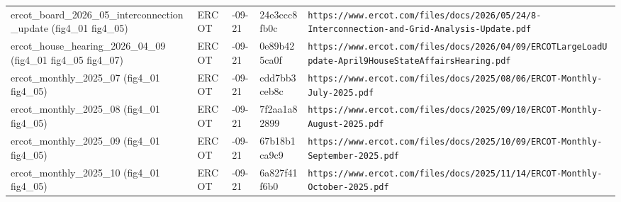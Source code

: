 \begin{longtable}{>{\raggedright\arraybackslash}p{3.0cm}>{\raggedright\arraybackslash}p{1.5cm}>{\raggedright\arraybackslash}p{1.4cm}>{\raggedright\arraybackslash}p{2.0cm}>{\raggedright\arraybackslash}p{6.0cm}}
ercot\_\allowbreak{}board\_\allowbreak{}2026\_\allowbreak{}05\_\allowbreak{}interconnection\_\allowbreak{}update (fig4\_\allowbreak{}01 fig4\_\allowbreak{}05) & ERCOT & 2026-09-21 & 24e3ccc8fb0c & \texttt{https:\allowbreak{}/\allowbreak{}/\allowbreak{}www.\allowbreak{}ercot.\allowbreak{}com/\allowbreak{}files/\allowbreak{}docs/\allowbreak{}2026/\allowbreak{}05/\allowbreak{}24/\allowbreak{}8-\allowbreak{}Interconnection-\allowbreak{}and-\allowbreak{}Grid-\allowbreak{}Analysis-\allowbreak{}Update.\allowbreak{}pdf} \\
ercot\_\allowbreak{}house\_\allowbreak{}hearing\_\allowbreak{}2026\_\allowbreak{}04\_\allowbreak{}09 (fig4\_\allowbreak{}01 fig4\_\allowbreak{}05 fig4\_\allowbreak{}07) & ERCOT & 2026-09-21 & 0e89b425ca0f & \texttt{https:\allowbreak{}/\allowbreak{}/\allowbreak{}www.\allowbreak{}ercot.\allowbreak{}com/\allowbreak{}files/\allowbreak{}docs/\allowbreak{}2026/\allowbreak{}04/\allowbreak{}09/\allowbreak{}ERCOTLargeLoadUpdate-\allowbreak{}April9HouseStateAffairsHearing.\allowbreak{}pdf} \\
ercot\_\allowbreak{}monthly\_\allowbreak{}2025\_\allowbreak{}07 (fig4\_\allowbreak{}01 fig4\_\allowbreak{}05) & ERCOT & 2026-09-21 & cdd7bb3ceb8c & \texttt{https:\allowbreak{}/\allowbreak{}/\allowbreak{}www.\allowbreak{}ercot.\allowbreak{}com/\allowbreak{}files/\allowbreak{}docs/\allowbreak{}2025/\allowbreak{}08/\allowbreak{}06/\allowbreak{}ERCOT-\allowbreak{}Monthly-\allowbreak{}July-\allowbreak{}2025.\allowbreak{}pdf} \\
ercot\_\allowbreak{}monthly\_\allowbreak{}2025\_\allowbreak{}08 (fig4\_\allowbreak{}01 fig4\_\allowbreak{}05) & ERCOT & 2026-09-21 & 7f2aa1a82899 & \texttt{https:\allowbreak{}/\allowbreak{}/\allowbreak{}www.\allowbreak{}ercot.\allowbreak{}com/\allowbreak{}files/\allowbreak{}docs/\allowbreak{}2025/\allowbreak{}09/\allowbreak{}10/\allowbreak{}ERCOT-\allowbreak{}Monthly-\allowbreak{}August-\allowbreak{}2025.\allowbreak{}pdf} \\
ercot\_\allowbreak{}monthly\_\allowbreak{}2025\_\allowbreak{}09 (fig4\_\allowbreak{}01 fig4\_\allowbreak{}05) & ERCOT & 2026-09-21 & 67b18b1ca9c9 & \texttt{https:\allowbreak{}/\allowbreak{}/\allowbreak{}www.\allowbreak{}ercot.\allowbreak{}com/\allowbreak{}files/\allowbreak{}docs/\allowbreak{}2025/\allowbreak{}10/\allowbreak{}09/\allowbreak{}ERCOT-\allowbreak{}Monthly-\allowbreak{}September-\allowbreak{}2025.\allowbreak{}pdf} \\
ercot\_\allowbreak{}monthly\_\allowbreak{}2025\_\allowbreak{}10 (fig4\_\allowbreak{}01 fig4\_\allowbreak{}05) & ERCOT & 2026-09-21 & 6a827f41f6b0 & \texttt{https:\allowbreak{}/\allowbreak{}/\allowbreak{}www.\allowbreak{}ercot.\allowbreak{}com/\allowbreak{}files/\allowbreak{}docs/\allowbreak{}2025/\allowbreak{}11/\allowbreak{}14/\allowbreak{}ERCOT-\allowbreak{}Monthly-\allowbreak{}October-\allowbreak{}2025.\allowbreak{}pdf} \\

\end{longtable}
